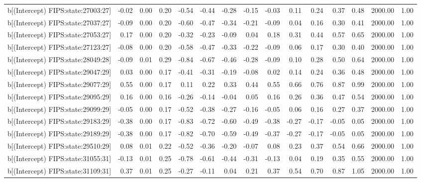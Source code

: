 \begin{table}[ht]
\begin{tabular}{rrrrrrrrrrrrrrr}
  b[(Intercept) FIPS:state:27003:27] & -0.02 & 0.00 & 0.20 & -0.54 & -0.44 & -0.28 & -0.15 & -0.03 & 0.11 & 0.24 & 0.37 & 0.48 & 2000.00 & 1.00 \\ 
  b[(Intercept) FIPS:state:27037:27] & -0.09 & 0.00 & 0.20 & -0.60 & -0.47 & -0.34 & -0.21 & -0.09 & 0.04 & 0.16 & 0.30 & 0.41 & 2000.00 & 1.00 \\ 
  b[(Intercept) FIPS:state:27053:27] & 0.17 & 0.00 & 0.20 & -0.32 & -0.23 & -0.09 & 0.04 & 0.18 & 0.31 & 0.44 & 0.57 & 0.65 & 2000.00 & 1.00 \\ 
  b[(Intercept) FIPS:state:27123:27] & -0.08 & 0.00 & 0.20 & -0.58 & -0.47 & -0.33 & -0.22 & -0.09 & 0.06 & 0.17 & 0.30 & 0.40 & 2000.00 & 1.00 \\ 
  b[(Intercept) FIPS:state:28049:28] & -0.09 & 0.01 & 0.29 & -0.84 & -0.67 & -0.46 & -0.28 & -0.09 & 0.10 & 0.28 & 0.50 & 0.64 & 2000.00 & 1.00 \\ 
  b[(Intercept) FIPS:state:29047:29] & 0.03 & 0.00 & 0.17 & -0.41 & -0.31 & -0.19 & -0.08 & 0.02 & 0.14 & 0.24 & 0.36 & 0.48 & 2000.00 & 1.00 \\ 
  b[(Intercept) FIPS:state:29077:29] & 0.55 & 0.00 & 0.17 & 0.11 & 0.22 & 0.33 & 0.44 & 0.55 & 0.66 & 0.76 & 0.87 & 0.99 & 2000.00 & 1.00 \\ 
  b[(Intercept) FIPS:state:29095:29] & 0.16 & 0.00 & 0.16 & -0.26 & -0.14 & -0.04 & 0.05 & 0.16 & 0.26 & 0.36 & 0.47 & 0.54 & 2000.00 & 1.00 \\ 
  b[(Intercept) FIPS:state:29099:29] & -0.05 & 0.00 & 0.17 & -0.52 & -0.38 & -0.27 & -0.16 & -0.05 & 0.06 & 0.16 & 0.27 & 0.37 & 2000.00 & 1.00 \\ 
  b[(Intercept) FIPS:state:29183:29] & -0.38 & 0.00 & 0.17 & -0.83 & -0.72 & -0.60 & -0.49 & -0.38 & -0.27 & -0.17 & -0.05 & 0.05 & 2000.00 & 1.00 \\ 
  b[(Intercept) FIPS:state:29189:29] & -0.38 & 0.00 & 0.17 & -0.82 & -0.70 & -0.59 & -0.49 & -0.37 & -0.27 & -0.17 & -0.05 & 0.05 & 2000.00 & 1.00 \\ 
  b[(Intercept) FIPS:state:29510:29] & 0.08 & 0.01 & 0.22 & -0.52 & -0.36 & -0.20 & -0.07 & 0.08 & 0.23 & 0.37 & 0.54 & 0.66 & 2000.00 & 1.00 \\ 
  b[(Intercept) FIPS:state:31055:31] & -0.13 & 0.01 & 0.25 & -0.78 & -0.61 & -0.44 & -0.31 & -0.13 & 0.04 & 0.19 & 0.35 & 0.55 & 2000.00 & 1.00 \\ 
  b[(Intercept) FIPS:state:31109:31] & 0.37 & 0.01 & 0.25 & -0.27 & -0.11 & 0.04 & 0.21 & 0.37 & 0.54 & 0.70 & 0.87 & 1.05 & 2000.00 & 1.00 \\ 

\end{tabular}
\end{table}
